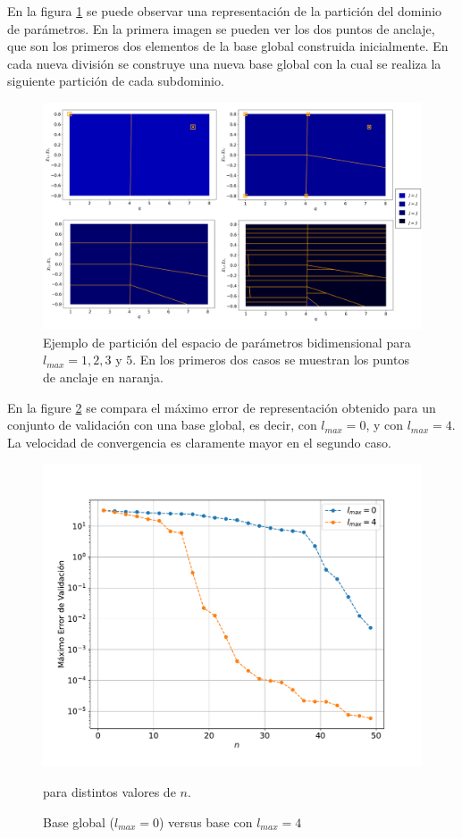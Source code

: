 En la figura \ref{fig:part1} se puede observar una representación de la partición del dominio de parámetros. En la primera imagen se pueden ver los dos puntos de anclaje, que son los primeros dos elementos de la base global construida inicialmente. En cada nueva división se construye una nueva base global con la cual se realiza la siguiente partición de cada subdominio.


\begin{figure}[h!]
\centering
\includegraphics[width=1\columnwidth]{figs/particion2d.png}
\caption{Ejemplo de partición del espacio de parámetros bidimensional para $l_{max}= 1, 2, 3$ y $5$. En los primeros dos casos se muestran los puntos de anclaje en naranja.}
\label{fig:part1}
\end{figure}


En la figure \ref{fig:l0vl4} se compara el máximo error de representación obtenido para un conjunto de validación con una base global, es decir, con $l_{max} = 0$, y con $l_{max}=4$. La velocidad de convergencia es claramente mayor en el segundo caso.

\begin{figure}[h!]
\centering
\includegraphics[width=.8\columnwidth, trim={0, 1.3cm, 0, 1.4cm}]{figs/l0vsl4.pdf}
\caption{Base global ($l_{max} = 0$) versus base con $l_{max} = 4$} para distintos valores de $n$.
\label{fig:l0vl4}
\end{figure}



